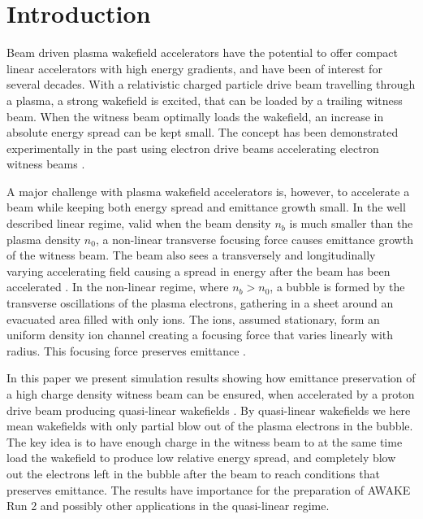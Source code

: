 \documentclass[aps,prstab,reprint,amsmath,amssymb,groupedaddress]{revtex4-1}
\begin{document}
\maketitle

\section{Introduction}\label{S:I}

Beam driven plasma wakefield accelerators \cite{chen:1985} have the potential to offer compact linear accelerators with
high energy gradients, and have been of interest for several decades. With a relativistic charged particle drive beam
travelling through a plasma, a strong wakefield is excited, that can be loaded by a trailing witness beam. When the
witness beam optimally loads the wakefield, an increase in absolute energy spread can be kept small. The concept has
been demonstrated experimentally in the past using electron drive beams accelerating electron witness beams
\cite{rosenzweig:1988, blumenfeld:2007, kallos:2008, litos:2014}. 

A major challenge with plasma wakefield accelerators is, however, to accelerate a beam while keeping both energy spread
and emittance growth small. In the well described linear regime, valid when the beam density $n_{b}$ is much smaller
than the plasma density $n_{0}$, a non-linear transverse focusing force causes emittance growth of the witness beam.
The beam also sees a transversely and longitudinally varying accelerating field causing a spread in energy after the
beam has been accelerated \cite{katsouleas:1987}. In the non-linear regime, where $n_{b} > n_{0}$, a bubble is formed by
the transverse oscillations of the plasma electrons, gathering in a sheet around an evacuated area filled with only
ions. The ions, assumed stationary, form an uniform density ion channel creating a focusing force that varies linearly
with radius. This focusing force preserves emittance \cite{rosenzweig:1991}.

In this paper we present simulation results showing how emittance preservation of a high charge density witness beam can
be ensured, when accelerated by a proton drive beam producing quasi-linear wakefields \cite{rosenzweig:2010}. By
quasi-linear wakefields we here mean wakefields with only partial blow out of the plasma electrons in the bubble.
The key idea is to have enough charge in the witness beam to at the same time load the wakefield to produce low relative
energy spread, and completely blow out the electrons left in the bubble after the beam to reach conditions that
preserves emittance. The results have importance for the preparation of AWAKE Run 2 and possibly other applications in
the quasi-linear regime.
\end{document}
